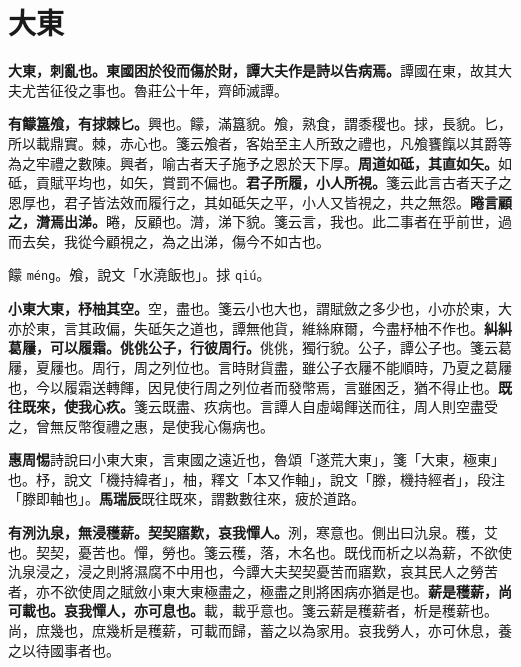 \section{大東}


\textbf{大東，刺亂也。東國困於役而傷於財，譚大夫作是詩以告病焉。}{\footnotesize 譚國在東，故其大夫尤苦征役之事也。魯莊公十年，齊師滅譚。}

\textbf{有饛簋飧，有捄棘匕。}{\footnotesize 興也。饛，滿簋貌。飧，熟食，謂黍稷也。捄，長貌。匕，所以載鼎實。棘，赤心也。箋云飧者，客始至主人所致之禮也，凡飧饔餼以其爵等為之牢禮之數陳。興者，喻古者天子施予之恩於天下厚。}\textbf{周道如砥，其直如矢。}{\footnotesize 如砥，貢賦平均也，如矢，賞罰不偏也。}\textbf{君子所履，小人所視。}{\footnotesize 箋云此言古者天子之恩厚也，君子皆法效而履行之，其如砥矢之平，小人又皆視之，共之無怨。}\textbf{睠言顧之，潸焉出涕。}{\footnotesize 睠，反顧也。潸，涕下貌。箋云言，我也。此二事者在乎前世，過而去矣，我從今顧視之，為之出涕，傷今不如古也。}

\begin{quoting}饛 \texttt{méng}。飧，說文「水澆飯也」。捄 \texttt{qiú}。\end{quoting}

\textbf{小東大東，杼柚其空。}{\footnotesize 空，盡也。箋云小也大也，謂賦斂之多少也，小亦於東，大亦於東，言其政偏，失砥矢之道也，譚無他貨，維絲麻爾，今盡杼柚不作也。}\textbf{糾糾葛屨，可以履霜。佻佻公子，行彼周行。}{\footnotesize 佻佻，獨行貌。公子，譚公子也。箋云葛屨，夏屨也。周行，周之列位也。言時財貨盡，雖公子衣屨不能順時，乃夏之葛屨也，今以履霜送轉餫，因見使行周之列位者而發幣焉，言雖困乏，猶不得止也。}\textbf{既往既來，使我心疚。}{\footnotesize 箋云既盡、疚病也。言譚人自虛竭餫送而往，周人則空盡受之，曾無反幣復禮之惠，是使我心傷病也。}

\begin{quoting}\textbf{惠周惕}詩說曰小東大東，言東國之遠近也，魯頌「遂荒大東」，箋「大東，極東」也。杼，說文「機持緯者」，柚，釋文「本又作軸」，說文「滕，機持經者」，段注「滕即軸也」。\textbf{馬瑞辰}既往既來，謂數數往來，疲於道路。\end{quoting}

\textbf{有洌氿泉，無浸穫薪。契契寤歎，哀我憚人。}{\footnotesize 洌，寒意也。側出曰氿泉。穫，艾也。契契，憂苦也。憚，勞也。箋云穫，落，木名也。既伐而析之以為薪，不欲使氿泉浸之，浸之則將濕腐不中用也，今譚大夫契契憂苦而寤歎，哀其民人之勞苦者，亦不欲使周之賦斂小東大東極盡之，極盡之則將困病亦猶是也。}\textbf{薪是穫薪，尚可載也。哀我憚人，亦可息也。}{\footnotesize 載，載乎意也。箋云薪是穫薪者，析是穫薪也。尚，庶幾也，庶幾析是穫薪，可載而歸，蓄之以為家用。哀我勞人，亦可休息，養之以待國事者也。}

